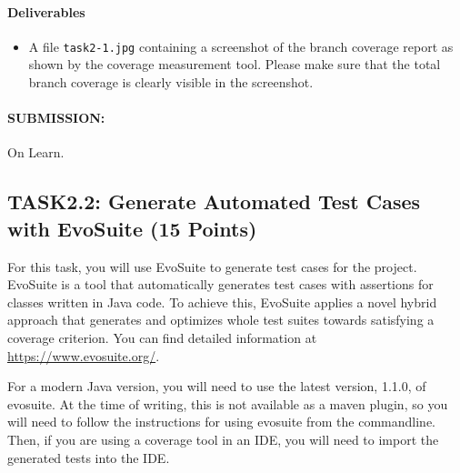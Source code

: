 \documentclass{article}
\begin{document}
\paragraph{Deliverables}

\begin{itemize}
\item A file \texttt{task2-1.jpg}
  containing a screenshot of the branch coverage report as shown by
  the coverage measurement tool. Please make sure that the total
  branch coverage is clearly visible in the screenshot.
\end{itemize}

\paragraph{SUBMISSION:}

On Learn.

\subsection{TASK2.2: Generate Automated Test Cases with EvoSuite (15 Points) }

For this task, you will use EvoSuite to generate test cases for the
project. EvoSuite is a tool that automatically generates test cases
with assertions for classes written in Java code. To achieve this,
EvoSuite applies a novel hybrid approach that generates and optimizes
whole test suites towards satisfying a coverage criterion. You can
find detailed information at \url{https://www.evosuite.org/}.

For a modern Java version, you will need to use the latest version,
1.1.0, of evosuite. At the time of writing, this is not available as a
maven plugin, so you will need to follow the instructions for using
evosuite from the commandline. Then, if you are using a coverage tool
in an IDE, you will need to import the generated tests into the IDE.

\end{document}

